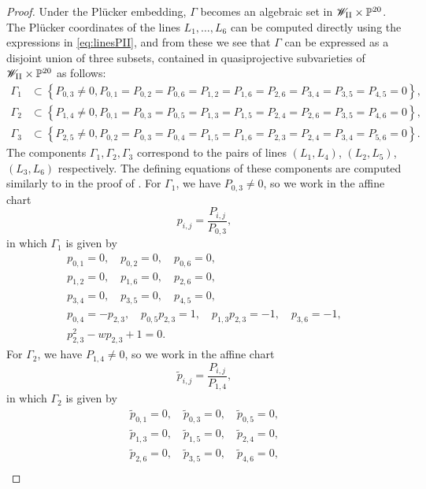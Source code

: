 \documentclass[a4paper,reqno]{amsart}
\numberwithin{equation}{section}
\newcommand{\p}{\mathbb{P}}
\numberwithin{equation}{section}
\begin{document}
\begin{proof}
Under the Pl\"ucker embedding, $\Gamma$ becomes an algebraic set in $\mathscr{W}_{\rm{II}}\times \p^{20}$. The Pl\"ucker coordinates of the lines $L_1,\dots,L_6$ can be computed directly using the expressions in \cref{eq:linesPII}, and from these we see that $\Gamma$ can be expressed as a disjoint union of three subsets, contained in quasiprojective subvarieties of $\mathscr{W}_{\rm{II}}\times \p^{20}$ as follows:
\begin{equation*}
    \begin{aligned}
        \Gamma_1 &\subset \left \{P_{0,3}\neq 0 ,  P_{0,1}=P_{0,2}=P_{0,6}=P_{1,2}=P_{1,6}=P_{2,6}=P_{3,4}=P_{3,5}=P_{4,5}=0 \right\}, \\ 
        \Gamma_2 &\subset \left \{P_{1,4}\neq 0 , P_{0,1}=P_{0,3}=P_{0,5}=P_{1,3}=P_{1,5}=P_{2,4}=P_{2,6}=P_{3,5}=P_{4,6}=0 \right\}, \\ 
        \Gamma_3 &\subset \left \{P_{2,5}\neq 0 ,P_{0,2}=P_{0,3}=P_{0,4}=P_{1,5}=P_{1,6}=P_{2,3}=P_{2,4}=P_{3,4}=P_{5,6}=0 \right\}.
    \end{aligned}
\end{equation*}
The components $\Gamma_1,\Gamma_2,\Gamma_3$ correspond to the pairs of lines $(L_1,L_4)$, $(L_2,L_5)$, $(L_3,L_6)$ respectively.
The defining equations of these components are computed similarly to in the proof of .
For $\Gamma_1$, we have $P_{0,3}\neq 0$, so we work in the affine chart 
$$p_{i,j}=\frac{P_{i,j}}{P_{0,3}},$$ 
in which $\Gamma_1$ is given by 
\begin{equation*}
    \begin{gathered}
    p_{0,1}=0,\quad p_{0,2}=0, \quad p_{0,6}=0,\\ 
    p_{1,2}=0, \quad p_{1,6}=0, \quad p_{2,6}=0, \\ 
    p_{3,4}=0,\quad p_{3,5}=0, \quad p_{4,5}=0, \\
         p_{0,4}=-p_{2,3}, \quad p_{0,5} p_{2,3}= 1, \quad p_{1,3} p_{2,3}= -1, \quad p_{3,6}=-1, \\
         p_{2,3}^2-w p_{2,3}+1=0.
    \end{gathered}
\end{equation*}
For $\Gamma_2$, we have $P_{1,4}\neq 0$, so we work in the affine chart 
$$\tilde{p}_{i,j}=\frac{P_{i,j}}{P_{1,4}},$$ 
in which $\Gamma_2$ is given by 
\begin{equation*}
\begin{gathered}
    \tilde{p}_{0,1}=0,\quad \tilde{p}_{0,3}=0, \quad \tilde{p}_{0,5}=0, \\
    \tilde{p}_{1,3}=0,\quad \tilde{p}_{1,5}=0, \quad \tilde{p}_{2,4}=0,\\ \tilde{p}_{2,6}=0,\quad \tilde{p}_{3,5}=0, \quad \tilde{p}_{4,6}=0,\\

\end{gathered}
\end{equation*}
\end{proof}
\end{document}
